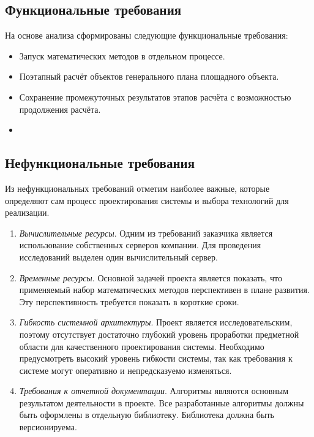 \subsection*{\large{Функциональные требования}}

На основе анализа сформированы следующие функциональные требования:
\begin{itemize}
    \item {
        Запуск математических методов в отдельном процессе.
    }
    \item {
        Поэтапный расчёт объектов генерального плана площадного объекта.
    }
    \item {
        Сохранение промежуточных результатов этапов расчёта с возможностью продолжения расчёта.
    }
    \item {

    }
\end{itemize}

\subsection*{\large{Нефункциональные требования}}

Из нефункциональных требований отметим наиболее важные, которые определяют сам процесс проектирования системы
и выбора технологий для реализации.

\begin{enumerate}
    \item {
        \textit{Вычислительные ресурсы}.
        Одним из требований заказчика является использование собственных серверов компании.
        Для проведения исследований выделен один вычислительный сервер.
    }
    \item {
        \textit{Временные ресурсы}.
        Основной задачей проекта является показать, что применяемый набор математических
        методов перспективен в плане развития. Эту перспективность требуется показать в короткие сроки.
    }
    \item {
        \textit{Гибкость системной архитектуры}.
        Проект является исследовательским, поэтому
        отсутствует достаточно глубокий уровень проработки предметной области для качественного проектирования системы.
        Необходимо предусмотреть высокий уровень гибкости системы,
        так как требования к системе могут оперативно и непредсказуемо изменяться.
    }
    \item {
        \textit{Требования к отчетной документации}.
        Алгоритмы являются основным результатом деятельности в проекте.
        Все разработанные алгоритмы должны быть оформлены в отдельную библиотеку.
        Библиотека должна быть версионируема.
    }
\end{enumerate}